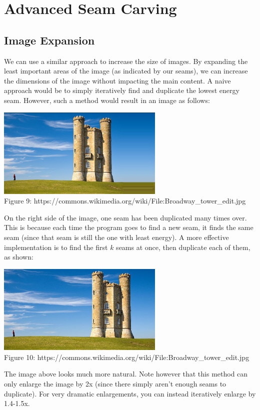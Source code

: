 \documentclass{article}
\begin{document}
\section{Advanced Seam Carving}
\subsection{Image Expansion}
We can use a similar approach to increase the size of images. By expanding the least important areas of the image (as indicated by our seams), we can increase the dimensions of the image without impacting the main content. A naive approach would be to simply iteratively find and duplicate the lowest energy seam. However, such a method would result in an image as follows:

\begin{center}
\includegraphics[width=8cm]{Naive_Castle_Resizing.jpg} \\
Figure 9: https://commons.wikimedia.org/wiki/File:Broadway\_tower\_edit.jpg
\end{center}
On the right side of the image, one seam has been duplicated many times over. This is because each time the program goes to find a new seam, it finds the same seam (since that seam is still the one with least energy). A more effective implementation is to find the first $k$ seams at once, then duplicate each of them, as shown:

\begin{center}
\includegraphics[width=8cm]{Smart_Resizing.jpg} \\
Figure 10: https://commons.wikimedia.org/wiki/File:Broadway\_tower\_edit.jpg
\end{center}
The image above looks much more natural. Note however that this method can only enlarge the image by 2x (since there simply aren't enough seams to duplicate). For very dramatic enlargements, you can instead iteratively enlarge by 1.4-1.5x.
\end{document}
